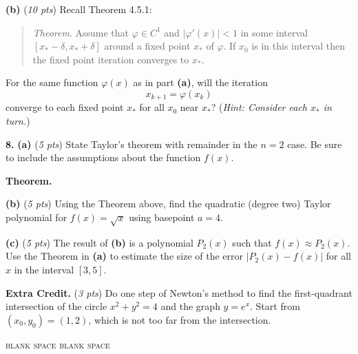 \documentclass[11pt]{amsart}
\newcommand{\prob}[1]{\bigskip\noindent\textbf{#1.} }
\newcommand{\pts}[1]{(\emph{#1 pts})}
\newcommand{\probpts}[2]{\prob{#1} \pts{#2} \quad}
\newcommand{\ppartpts}[2]{\textbf{(#1)} \pts{#2} \quad}
\newcommand{\epartpts}[2]{\medskip\noindent \textbf{(#1)} \pts{#2} \quad}
\begin{document}
\epartpts{b}{10} Recall Theorem 4.5.1:

\medskip
\begin{quote}
\noindent \emph{Theorem}.  Assume that $\varphi\in C^1$ and $|\varphi'(x)|<1$ in some interval $[x_\ast - \delta,x_\ast+\delta]$ around a fixed point $x_\ast$ of $\varphi$.  If $x_0$ is in this interval then the fixed point iteration converges to $x_\ast$.
\end{quote}

\medskip
\noindent For the same function $\varphi(x)$ as in part \textbf{(a)}, will the iteration
	$$x_{k+1} = \varphi(x_k)$$
converge to each fixed point $x_\ast$ for all $x_0$ near $x_\ast$?  (\emph{Hint:  Consider each $x_\ast$ in turn.})
\vfill


\newpage
\prob{8} \ppartpts{a}{5}  State Taylor's theorem with remainder in the $n=2$ case.  Be sure to include the assumptions about the function $f(x)$.

\bigskip
\noindent \textbf{Theorem.}  
\vspace{2.5in}

\epartpts{b}{5}  Using the Theorem above, find the quadratic (degree two) Taylor polynomial for $f(x)=\sqrt{x}$ using basepoint $a=4$.
\vfill

\epartpts{c}{5}  The result of \textbf{(b)} is a polynomial $P_2(x)$ such that $f(x)\approx P_2(x)$.  Use the Theorem in \textbf{(a)} to estimate the size of the error $|P_2(x)-f(x)|$ for all $x$ in the interval $[3,5]$.
\vfill


\newpage
\probpts{Extra Credit}{3}  Do one step of Newton's method to find the first-quadrant intersection of the circle $x^2+y^2=4$ and the graph $y=e^x$.  Start from $(x_0,y_0)=(1,2)$, which is not too far from the intersection.

\vfill

\noindent \hrulefill

\tiny
\noindent \textsc{blank space} \hfill \textsc{blank space}
\vfill
\end{document}
